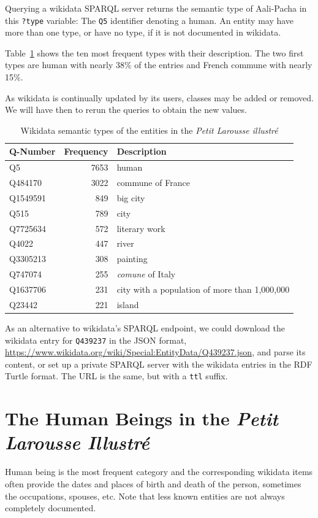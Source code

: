 \documentclass[10pt, a4paper]{article}
\begin{document}
Querying a wikidata SPARQL server returns the semantic type of Aali-Pacha in this \verb=?type= variable: The \verb=Q5= identifier denoting a human. An entity may have more than one type, or have no type, if it is not documented in wikidata.

Table~\ref{tab:types} shows the ten most frequent types with their description.  The two first types are human with nearly 38\% of the entries and French commune with nearly 15\%.

As wikidata is continually updated by its users, classes may be added or removed. We will have then to rerun the queries to obtain the new values.

\begin{table}[t]
\centering
\begin{tabular}{lrp{3.5cm}}
\hline
Q-Number&Frequency&Description\\
\hline
Q5 &7653& human\\
Q484170& 3022&commune of France\\
Q1549591& 849& big city\\
Q515& 789&city\\
Q7725634& 572&literary work\\
Q4022& 447&river\\
Q3305213& 308&painting\\
Q747074& 255&\textit{comune} of Italy\\
Q1637706& 231&city with a population of more than 1,000,000\\
Q23442& 221&island\\
\hline
\end{tabular}
\caption{Wikidata semantic types of the entities in the \textit{Petit Larousse illustré}}
\label{tab:types}
\end{table}

As an alternative to wikidata's SPARQL endpoint, we could download the wikidata entry for \verb=Q439237= in the JSON format, \url{https://www.wikidata.org/wiki/Special:EntityData/Q439237.json}, and parse its content, or set up a private SPARQL server with the wikidata entries in the RDF Turtle format. The URL is the same, but with a \verb=ttl= suffix.

\section{The Human Beings in the \textit{Petit Larousse Illustré}}
Human being is the most frequent category and the corresponding wikidata items often provide the dates and places of birth and death of the person, sometimes the occupations, spouses, etc. Note that less known entities are not always completely documented.
\end{document}
